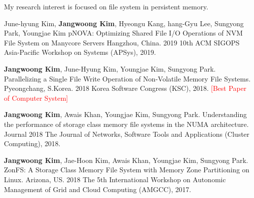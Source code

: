 

  My research interest is focused on file system in persistent memory.\\
\begin{cventries}


  \cventry
    {June-hyung Kim, \textbf{Jangwoong Kim}, Hyeongu Kang, hang-Gyu Lee, Sungyong Park, Youngjae Kim} %
    {pNOVA: Optimizing Shared File I/O Operations of NVM File System on Manycore Servers} %
    {Hangzhou, China.} %
    {2019} %
    {
      10th ACM SIGOPS Asia-Pacific Workshop on Systems (APSys), 2019.
    }

  \cventry
	{\textbf{Jangwoong Kim}, June-Hyung Kim, Youngjae Kim,  Sungyong Park.}
	{Parallelizing a Single File Write Operation of Non-Volatile Memory File Systems.}
	{Pyeongchang, S.Korea.}
	{2018}
	{
		Korea Software Congress (KSC), 2018. \textcolor{red}{[Best Paper of Computer System]}
	}

  \cventry
	{\textbf{Jangwoong Kim},  Awais Khan,  Youngjae Kim,  Sungyong Park.}
	{Understanding the performance of storage class memory file systems in the NUMA architecture.}
	{Journal}
	{2018}
	{
		The Journal of Networks, Software Tools and Applications (Cluster Computing), 2018.
	}

  \cventry
	{\textbf{Jangwoong Kim}, Jae-Hoon Kim,  Awais Khan,  Youngjae Kim,  Sungyong Park.}
	{ZonFS: A Storage Class Memory File System with Memory Zone Partitioning on Linux.}
	{Arizona, US.}
	{2018}
	{
		The 5th International Workshop on Autonomic Management of Grid and Cloud Computing (AMGCC), 2017.
	}


\end{cventries}

\clearpage
